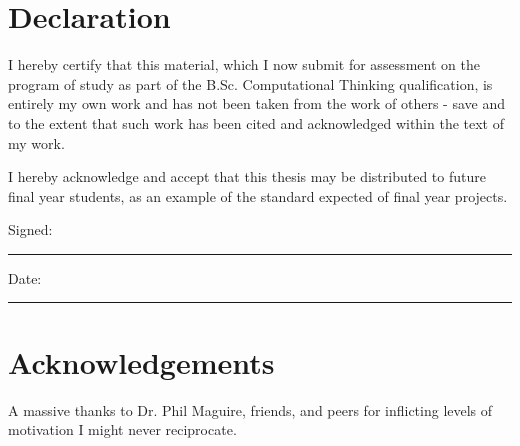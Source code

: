\documentclass[12pt,a4paper,twoside]{report}
\begin{document}
\newpage

\tableofcontents

\newpage

\thispagestyle{empty}


\section*{Declaration}

I hereby certify that this material, which I now submit for assessment on the program of study as part of the B.Sc. Computational Thinking qualification, is entirely my own work and has not been taken from the work of others - save and to the extent that such work has been cited and acknowledged within the text of my work.

I hereby acknowledge and accept that this thesis may be distributed to future final year students, as an example of the standard expected of final year projects.


\vspace{2cm}

Signed: \rule{5cm}{0.4pt} \hfill Date: \rule{3cm}{0.4pt}

\vspace{2cm}

\null
\newpage
\thispagestyle{empty}


\section*{Acknowledgements}

A massive thanks to Dr. Phil Maguire, friends, and peers for inflicting levels of motivation I might never reciprocate.

\vfill
\null

\newpage

\begin{abstract}

The logic of computer software is primarily expressed using programming languages, but the balance between versatile and efficient programming languages remains a major challenge. Changes to the execution environment of a program can impact performance, or worse, cause incompatibilities that require major refactoring. Developers often maintain multiple branches of a codebase to keep performance to acceptable levels. One particular difference between execution environments is whether individual modules are statically linked at compile-time or dynamically resolved at runtime. In this research project, we propose a prototype programming language called ``Essence C'' that better supports the continuum of static and dynamic modules, by allowing the programmer to write code once that is agnostic to the linking strategy. By taking advantage of LLVM's intermediate representation, it is possible to advance the state-of-the-art of link-time optimizations across module boundaries.

\end{abstract}
\end{document}
